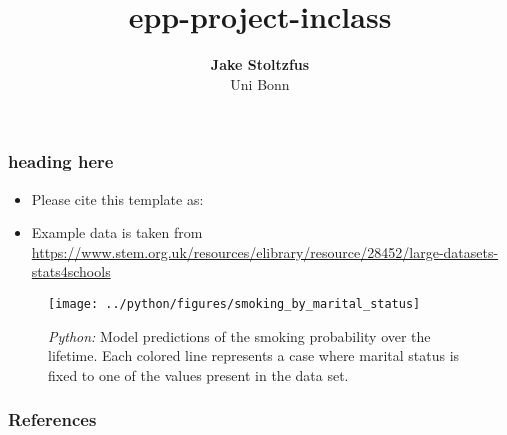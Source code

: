 \documentclass[11pt, aspectratio=169]{beamer}
\begin{document}
\title{epp-project-inclass}

\author[Jake Stoltzfus]
{
{\bf Jake Stoltzfus}\\
{\small Uni Bonn}\\[1ex]
}


\begin{frame}
    \titlepage
    \note{~}
\end{frame}


\begin{frame}[t]
    \frametitle{heading here}
    \begin{itemize}
        \item<+-> Please cite this template as: \citet{GaudeckerEconProjectTemplates}
        \item<+-> Example data is taken from \url{https://www.stem.org.uk/resources/elibrary/resource/28452/large-datasets-stats4schools}
    \end{itemize}
    \note{~}
\end{frame}



\begin{frame}[t]
    \begin{figure}[H]

        \centering
        \texttt{[image: ../python/figures/smoking\_by\_marital\_status]}

        \caption{\emph{Python:} Model predictions of the smoking probability over the
            lifetime. Each colored line represents a case where marital status is fixed to
            one of the values present in the data set.}
        \label{fig:python-predictions}

    \end{figure}
\end{frame}






 {
    \begin{frame}
        \frametitle{}
    \end{frame}

}

\begin{frame}[allowframebreaks]
    \frametitle{References}
    \renewcommand{\bibfont}{\normalfont\footnotesize}
    \printbibliography
\end{frame}
\end{document}
